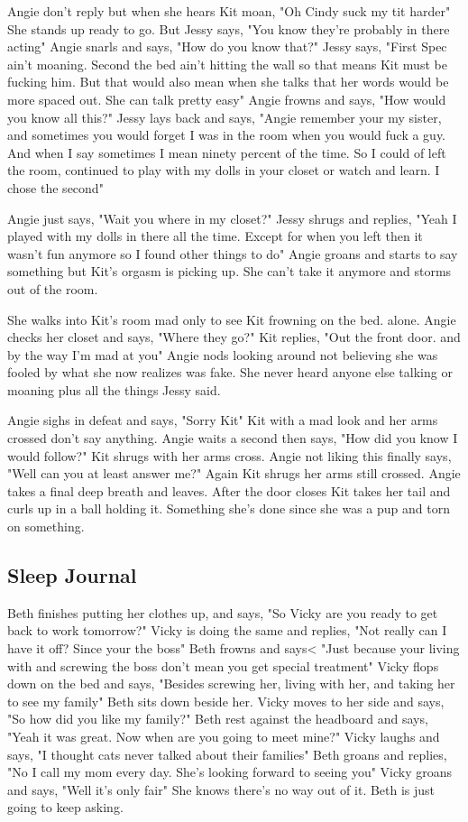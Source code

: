\documentclass{article}[12px]
\begin{document}
    Angie don't reply but when she hears Kit moan, "Oh Cindy suck my tit harder" She stands up ready to go. But Jessy says, "You know they're probably in there acting" Angie snarls and says, "How do you know that?" Jessy says, "First Spec ain't moaning. Second the bed ain't hitting the wall so that means Kit must be fucking him. But that would also mean when she talks that her words would be more spaced out. She can talk pretty easy" Angie frowns and says, "How would you know all this?" Jessy lays back and says, "Angie remember your my sister, and sometimes you would forget I was in the room when you would fuck a guy. And when I say sometimes I mean ninety percent of the time. So I could of left the room, continued to play with my dolls in your closet or watch and learn. I chose the second"

    Angie just says, "Wait you where in my closet?" Jessy shrugs and replies, "Yeah I played with my dolls in there all the time. Except for when you left then it wasn't fun anymore so I found other things to do" Angie groans and starts to say something but Kit's orgasm is picking up. She can't take it anymore and storms out of the room.

    She walks into Kit's room mad only to see Kit frowning on the bed. alone. Angie checks her closet and says, "Where they go?" Kit replies, "Out the front door. and by the way I'm mad at you" Angie nods looking around not believing she was fooled by what she now realizes was fake. She never heard anyone else talking or moaning plus all the things Jessy said.

    Angie sighs in defeat and says, "Sorry Kit" Kit with a mad look and her arms crossed don't say anything. Angie waits a second then says, "How did you know I would follow?" Kit shrugs with her arms cross. Angie not liking this finally says, "Well can you at least answer me?" Again Kit shrugs her arms still crossed. Angie takes a final deep breath and leaves. After the door closes Kit takes her tail and curls up in a ball holding it. Something she's done since she was a pup and torn on something.

\subsection {Sleep Journal}
    Beth finishes putting her clothes up, and says, "So Vicky are you ready to get back to work tomorrow?" Vicky is doing the same and replies, "Not really can I have it off? Since your the boss" Beth frowns and says< "Just because your living with and screwing the boss don't mean you get special treatment" Vicky flops down on the bed and says, "Besides screwing her, living with her, and taking her to see my family" Beth sits down beside her. Vicky moves to her side and says, "So how did you like my family?" Beth rest against the headboard and says, "Yeah it was great. Now when are you going to meet mine?" Vicky laughs and says, "I thought cats never talked about their families" Beth groans and replies, "No I call my mom every day. She's looking forward to seeing you" Vicky groans and says, "Well it's only fair" She knows there's no way out of it. Beth is just going to keep asking.\\
\end{document}
